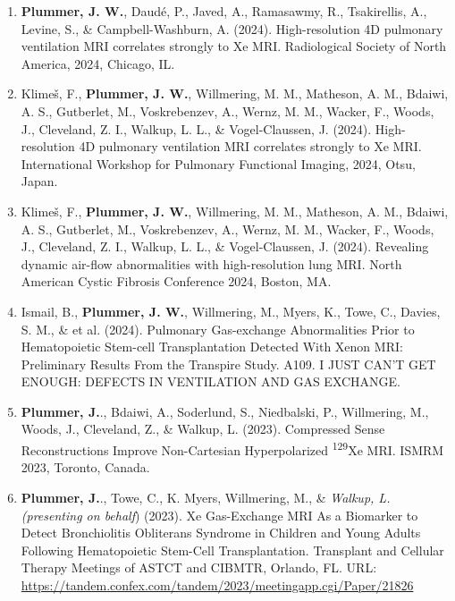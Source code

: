 \documentclass[12pt,]{scrartcl}
\begin{document}
\begin{enumerate}
  \leftskip-0.13in %

  
  

  \item \textbf{Plummer, J. W.}, Daudé, P., Javed, A., Ramasawmy, R., Tsakirellis, A., Levine, S., \& Campbell-Washburn, A. (2024). High-resolution 4D pulmonary ventilation MRI correlates strongly to Xe MRI. Radiological Society of North America, 2024, Chicago, IL.

  \item Klimeš, F., \textbf{Plummer, J. W.}, Willmering, M. M., Matheson, A. M., Bdaiwi, A. S., Gutberlet, M., Voskrebenzev, A., Wernz, M. M., Wacker, F., Woods, J., Cleveland, Z. I., Walkup, L. L., \& Vogel-Claussen, J. (2024). High-resolution 4D pulmonary ventilation MRI correlates strongly to Xe MRI. International Workshop for Pulmonary Functional Imaging, 2024, Otsu, Japan.

  \item Klimeš, F., \textbf{Plummer, J. W.}, Willmering, M. M., Matheson, A. M., Bdaiwi, A. S., Gutberlet, M., Voskrebenzev, A., Wernz, M. M., Wacker, F., Woods, J., Cleveland, Z. I., Walkup, L. L., \& Vogel-Claussen, J. (2024). Revealing dynamic air-flow abnormalities with high-resolution lung MRI. North American Cystic Fibrosis Conference 2024, Boston, MA. 
  
  \item Ismail, B., \textbf{Plummer, J. W.}, Willmering, M., Myers, K., Towe, C., Davies, S. M., \& et al. (2024). Pulmonary Gas-exchange Abnormalities Prior to Hematopoietic Stem-cell Transplantation Detected With Xenon MRI: Preliminary Results From the Transpire Study. A109. I JUST CAN'T GET ENOUGH: DEFECTS IN VENTILATION AND GAS EXCHANGE.
  
  \item \textbf{Plummer, J.}., Bdaiwi, A., Soderlund, S., Niedbalski, P., Willmering, M., Woods, J., Cleveland, Z., \& Walkup, L. (2023). Compressed Sense Reconstructions Improve Non-Cartesian Hyperpolarized \textsuperscript{129}Xe MRI. ISMRM 2023, Toronto, Canada.
  
  \item \textbf{Plummer, J.}., Towe, C., K. Myers, Willmering, M., \&  \textit{Walkup, L. (presenting on behalf}) (2023). Xe Gas-Exchange MRI As a Biomarker to Detect Bronchiolitis Obliterans Syndrome in Children and Young Adults Following Hematopoietic Stem-Cell Transplantation. Transplant and Cellular Therapy Meetings of ASTCT and CIBMTR, Orlando, FL. URL: \href{https://tandem.confex.com/tandem/2023/meetingapp.cgi/Paper/21826}{https://tandem.confex.com/tandem/2023/meetingapp.cgi/Paper/21826}
  

\end{enumerate}
\end{document}
